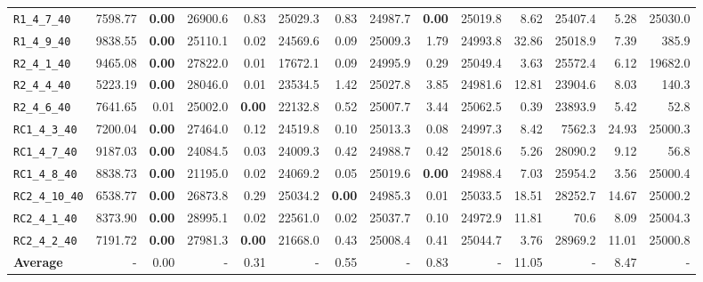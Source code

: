 \begin{table}[ht]
\begin{adjustbox}{width=\textwidth}
\begin{tabular}{l r r r @{\hspace{8pt}} r r @{\hspace{8pt}} r r @{\hspace{8pt}} r r @{\hspace{8pt}} r r @{\hspace{8pt}} r r @{\hspace{8pt}}}
\texttt{R1\_4\_7\_40} & 7598.77 & \textbf{0.00} & 26900.6 & 0.83 & 25029.3 & 0.83 & 24987.7 & \textbf{0.00} & 25019.8 & 8.62 & 25407.4 & 5.28 & 25030.0 \\
\texttt{R1\_4\_9\_40} & 9838.55 & \textbf{0.00} & 25110.1 & 0.02 & 24569.6 & 0.09 & 25009.3 & 1.79 & 24993.8 & 32.86 & 25018.9 & 7.39 & 385.9 \\
\texttt{R2\_4\_1\_40} & 9465.08 & \textbf{0.00} & 27822.0 & 0.01 & 17672.1 & 0.09 & 24995.9 & 0.29 & 25049.4 & 3.63 & 25572.4 & 6.12 & 19682.0 \\
\texttt{R2\_4\_4\_40} & 5223.19 & \textbf{0.00} & 28046.0 & 0.01 & 23534.5 & 1.42 & 25027.8 & 3.85 & 24981.6 & 12.81 & 23904.6 & 8.03 & 140.3 \\
\texttt{R2\_4\_6\_40} & 7641.65 & 0.01 & 25002.0 & \textbf{0.00} & 22132.8 & 0.52 & 25007.7 & 3.44 & 25062.5 & 0.39 & 23893.9 & 5.42 & 52.8 \\
\texttt{RC1\_4\_3\_40} & 7200.04 & \textbf{0.00} & 27464.0 & 0.12 & 24519.8 & 0.10 & 25013.3 & 0.08 & 24997.3 & 8.42 & 7562.3 & 24.93 & 25000.3 \\
\texttt{RC1\_4\_7\_40} & 9187.03 & \textbf{0.00} & 24084.5 & 0.03 & 24009.3 & 0.42 & 24988.7 & 0.42 & 25018.6 & 5.26 & 28090.2 & 9.12 & 56.8 \\
\texttt{RC1\_4\_8\_40} & 8838.73 & \textbf{0.00} & 21195.0 & 0.02 & 24069.2 & 0.05 & 25019.6 & \textbf{0.00} & 24988.4 & 7.03 & 25954.2 & 3.56 & 25000.4 \\
\texttt{RC2\_4\_10\_40} & 6538.77 & \textbf{0.00} & 26873.8 & 0.29 & 25034.2 & \textbf{0.00} & 24985.3 & 0.01 & 25033.5 & 18.51 & 28252.7 & 14.67 & 25000.2 \\
\texttt{RC2\_4\_1\_40} & 8373.90 & \textbf{0.00} & 28995.1 & 0.02 & 22561.0 & 0.02 & 25037.7 & 0.10 & 24972.9 & 11.81 & 70.6 & 8.09 & 25004.3 \\
\texttt{RC2\_4\_2\_40} & 7191.72 & \textbf{0.00} & 27981.3 & \textbf{0.00} & 21668.0 & 0.43 & 25008.4 & 0.41 & 25044.7 & 3.76 & 28969.2 & 11.01 & 25000.8 \\
\midrule
\textbf{Average} & - & 0.00 & - & 0.31 & - & 0.55 & - & 0.83 & - & 11.05 & - & 8.47 & - \\
\bottomrule
\end{tabular}
\end{adjustbox}
\end{table}